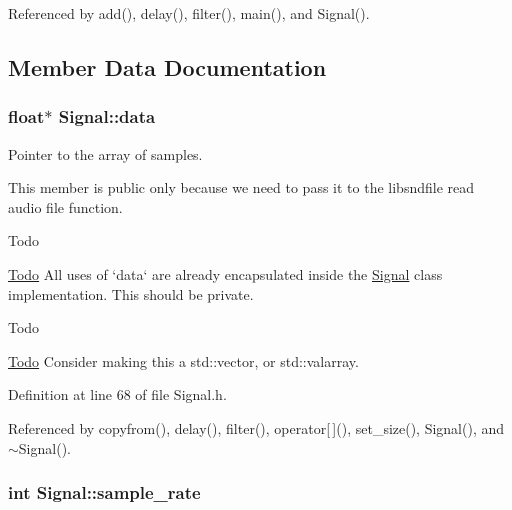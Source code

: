 \-Referenced by add(), delay(), filter(), main(), and \-Signal().



\subsection{\-Member \-Data \-Documentation}
\hypertarget{classSignal_aa9322b424cb7f66597c8ab19ac402423}{
\subsubsection[{data}]{\setlength{\rightskip}{0pt plus 5cm}float$\ast$ {\bf \-Signal\-::data}}}\label{classSignal_aa9322b424cb7f66597c8ab19ac402423}


\-Pointer to the array of samples. 

\-This member is public only because we need to pass it to the libsndfile read audio file function.

\begin{DoxyRefDesc}{\-Todo}
\item[\hyperlink{todo__todo000013}{\-Todo}]\-All uses of `data` are already encapsulated inside the \hyperlink{classSignal}{\-Signal} class implementation. \-This should be private.\end{DoxyRefDesc}


\begin{DoxyRefDesc}{\-Todo}
\item[\hyperlink{todo__todo000014}{\-Todo}]\-Consider making this a std\-::vector, or std\-::valarray. \end{DoxyRefDesc}


\-Definition at line 68 of file \-Signal.\-h.



\-Referenced by copyfrom(), delay(), filter(), operator\mbox{[}$\,$\mbox{]}(), set\-\_\-size(), \-Signal(), and $\sim$\-Signal().

\hypertarget{classSignal_ad07ccb1653bcd36f89f095c7bf7ae877}{
\subsubsection[{sample\-\_\-rate}]{\setlength{\rightskip}{0pt plus 5cm}int {\bf \-Signal\-::sample\-\_\-rate}}}\label{classSignal_ad07ccb1653bcd36f89f095c7bf7ae877}


